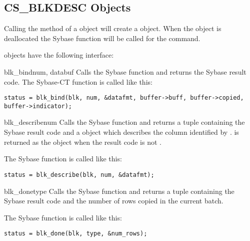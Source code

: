 \subsection{CS_BLKDESC Objects}

Calling the  method of a 
object will create a  object.  When the
 object is deallocated the Sybase
 function will be called for the command.

 objects have the following interface:

\begin{methoddesc}[CS_BLKDESC]{blk_bind}{num, databuf}
Calls the Sybase  function and returns the Sybase
result code.  The Sybase-CT  function is called
like this:

\begin{verbatim}
status = blk_bind(blk, num, &datafmt, buffer->buff, buffer->copied, buffer->indicator);
\end{verbatim}
\end{methoddesc}

\begin{methoddesc}[CS_BLKDESC]{blk_describe}{num}
Calls the Sybase  function and returns a
tuple containing the Sybase result code and a 
object which describes the column identified by . 
is returned as the  object when the result code is
not .

The Sybase  function is called like this:

\begin{verbatim}
status = blk_describe(blk, num, &datafmt);
\end{verbatim}
\end{methoddesc}

\begin{methoddesc}[CS_BLKDESC]{blk_done}{type}
Calls the Sybase  function and returns a tuple
containing the Sybase result code and the number of rows copied in the
current batch.

The Sybase  function is called like this:

\begin{verbatim}
status = blk_done(blk, type, &num_rows);
\end{verbatim}
\end{methoddesc}

